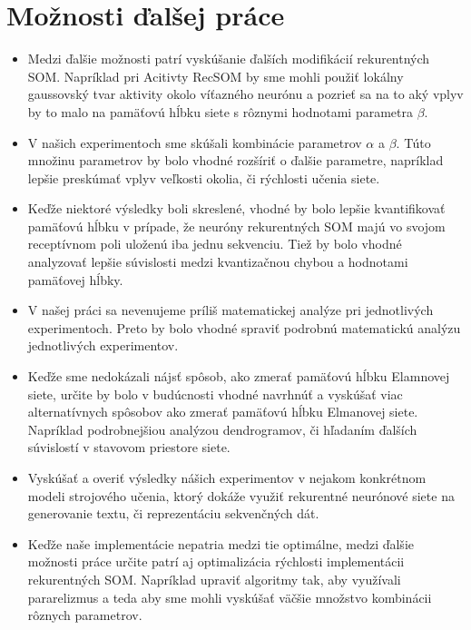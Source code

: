 \section{Možnosti ďalšej práce}
\begin{itemize}
    \item Medzi ďalšie možnosti patrí vyskúšanie ďalších modifikácií rekurentných SOM. 
    Napríklad pri Acitivty RecSOM by sme mohli použiť lokálny gaussovský tvar aktivity okolo víťazného neurónu a pozrieť sa na to aký vplyv by to malo 
    na pamäťovú hĺbku siete s rôznymi hodnotami parametra $\beta$.
    \item V našich experimentoch sme skúšali kombinácie parametrov $\alpha$ a $\beta$. Túto množinu parametrov by bolo vhodné rozšíriť o ďalšie parametre, napríklad
    lepšie preskúmať vplyv veľkosti okolia, či rýchlosti učenia siete.
    \item Keďže niektoré výsledky boli skreslené, vhodné by bolo lepšie kvantifikovať pamäťovú hĺbku v prípade, že neuróny rekurentných SOM majú vo svojom
    receptívnom poli uloženú iba jednu sekvenciu. 
    Tiež by bolo vhodné analyzovať lepšie súvislosti medzi kvantizačnou chybou a hodnotami pamäťovej hĺbky.
    \item V našej práci sa nevenujeme príliš matematickej analýze pri jednotlivých experimentoch.
    Preto by bolo vhodné spraviť podrobnú matematickú analýzu jednotlivých experimentov.
    \item Keďže sme nedokázali nájsť spôsob, ako zmerať pamäťovú hĺbku Elamnovej siete, určite by bolo 
    v budúcnosti vhodné navrhnúť a vyskúšať viac alternatívnych spôsobov ako zmerať pamäťovú hĺbku Elmanovej siete. 
    Napríklad podrobnejšiou analýzou dendrogramov, či hľadaním ďalších súvislostí v stavovom priestore siete.
    \item Vyskúšať a overiť výsledky nášich experimentov v nejakom konkrétnom modeli strojového učenia, ktorý dokáže 
    využiť rekurentné neurónové siete na generovanie textu, či reprezentáciu sekvenčných dát.
    \item Keďže naše implementácie nepatria medzi tie optimálne, medzi ďalšie možnosti práce
    určite patrí aj optimalizácia rýchlosti implementácii rekurentných SOM. Napríklad upraviť algoritmy tak, aby využívali
    pararelizmus a teda aby sme mohli vyskúšať väčšie množstvo kombinácii rôznych parametrov.
\end{itemize}





